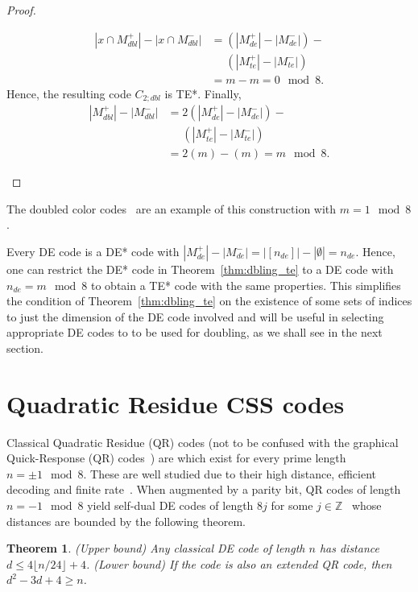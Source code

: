 \documentclass[journal]{IEEEtran}
\newtheorem{theorem}{Theorem}[section]
\begin{document}
\begin{proof}
\begin{itemize}
        \begin{equation}
        \begin{split}
        |x \cap M_{dbl}^+|-|x \cap M_{dbl}^-|
        &=\left(|M_{de}^+|-|M_{de}^-|\right)-\\
        &\phantom{{}=}\left(|M_{te}^+|-|M_{te}^-|\right)\\
        &=m-m = 0\mod{8}.
        \end{split}
        \end{equation}
        Hence, the resulting code $C_{2;dbl}$ is TE*. Finally, 
        \begin{equation}
        \begin{split}
            |M_{dbl}^+|-|M_{dbl}^-|&=2\left(|M_{de}^+|-|M_{de}^-|\right)-\\
            &\phantom{{}=}\left(|M_{te}^+|-|M_{te}^-|\right)\\
            &= 2(m)-(m) = m\mod{8}.
        \end{split}
        \end{equation}
    \end{itemize}
\end{proof}
The doubled color codes~\cite{bravyi_doubled_2015} are an example of this construction with $m=1 \mod{8}$. 

Every DE code is a DE* code with $|M_{de}^+|-|M_{de}^-|=|[n_{de}]|-|\emptyset|=n_{de}$. Hence, one can restrict the DE* code in Theorem~\ref{thm:dbling_te} to a DE code with $n_{de}=m\mod{8}$ to obtain a TE* code with the same properties.
This simplifies the condition of Theorem~\ref{thm:dbling_te} on the existence of some sets of indices to just the dimension of the DE code involved and will be useful in selecting appropriate DE codes to to be used for doubling, as we shall see in the next section.


\section{Quadratic Residue CSS codes}
\label{sec:qr_codes}
Classical Quadratic Residue (QR) codes (not to be confused with the graphical Quick-Response (QR) codes~\cite{tiwari_introduction_2016}) are  which exist for every prime length $n=\pm 1\mod{8}$. These are well studied due to their high distance, efficient decoding and finite rate~\cite{macwilliams_theory_1977}. 
When augmented by a parity bit, QR codes of length $n=-1\mod{8}$ yield self-dual DE codes of length $8j$ for some $j\in\mathbb{Z}$~\cite{ward_weight_1990} whose distances are bounded by the following theorem.
\begin{theorem}\label{thm:sd_distancebound}\cite{macwilliams_theory_1977, rains_self-dual_2002}
 (Upper bound) Any classical DE code of length $n$ has distance $d\leq 4\lfloor n/24 \rfloor +4$. (Lower bound) If the code is also an extended QR code, then $d^2-3d+4\geq n$.
\end{theorem}
\end{document}
